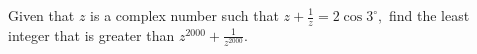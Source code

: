 Given that $z$ is a complex number such that $z+\frac 1z=2\cos 3^\circ,$ find the least integer that is greater than $z^{2000}+\frac 1{z^{2000}}.$